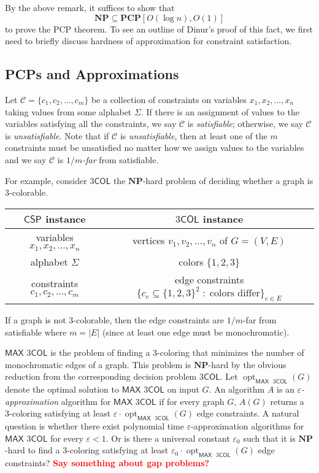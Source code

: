 \documentclass{article}
\newcommand{\fixme}[1] { \textcolor{red} {
{\fbox{ {\bf Fix:} \ensuremath{\blacktriangleright }} {\bf #1}
\fbox{\ensuremath{\blacktriangleleft} } } } }
\newcommand{\class}[1]{\mathbf{#1}}
\newcommand{\NP}{\class{NP}}
\newcommand{\PCP}{\class{PCP}}
\newcommand{\CSP}{\mathsf{CSP}}
\newcommand{\COL}{\mathsf{COL}}
\newcommand{\MAX}{\mathsf{MAX}}
\newcommand{\opt}{{\operatorname{opt}}}
\begin{document}
By the above remark, it suffices to show that
$$
\NP \subseteq \PCP[O(\log n), O(1)]
$$
to prove the PCP theorem.
To see an outline of Dinur's proof of this fact, we first need to briefly
discuss hardness of approximation for constraint satisfaction.

\subsection{PCPs and Approximations}


Let $\mathcal{C} = \{c_1, c_2, \dots, c_m\}$ be a collection of constraints on
variables $x_1, x_2, \dots, x_n$ taking values from some alphabet $\Sigma$.
If there is an assignment of values to the variables satisfying all the
constraints, we say $\mathcal{C}$ is \emph{satisfiable}; otherwise, we say
$\mathcal{C}$ is \emph{unsatisfiable}.
Note that if $\mathcal{C}$ is \emph{unsatisfiable}, then at least one of the
$m$ constraints must be unsatisfied no matter how we assign values to the
variables and we say $\mathcal{C}$ is \emph{$1/m$-far} from satisfiable. 

For example, consider $3\COL$ the $\NP$-hard problem of deciding whether a graph is 3-colorable.
\begin{center}
\begin{tabular}{c @{$\quad\longleftrightarrow\quad$} c}
$\CSP$ instance & $3\COL$ instance\\
\hline
variables $x_1, x_2, \dots, x_n$ & vertices $v_1, v_2, \dots, v_n$ of $G = (V, E)$\\
alphabet $\Sigma$ & colors $\{1, 2, 3\}$ \\
constraints $c_1, c_2, \dots, c_m$ & edge constraints $\{c_e \subseteq \{1, 2, 3\}^2 \;:\;\text{colors differ}\}_{e \in E}$\\
\end{tabular}
\end{center}
If a graph is not 3-colorable, then the edge constraints are $1/m$-far from satisfiable
where $m=|E|$ (since at least one edge must be monochromatic).

$\MAX$ $3\COL$ is the problem of finding a 3-coloring that minimizes the
number of monochromatic edges of a graph.
This problem is $\NP$-hard by the obvious reduction from the corresponding
decision problem $3\COL$.
Let $\opt_{\MAX\text{ }3\COL}(G)$ denote the optimal solution to $\MAX$ $3\COL$
on input $G$.
An algorithm $A$ is an \emph{$\varepsilon$-approximation} algorithm for
$\MAX$ $3\COL$ if for every graph $G$, $A(G)$ returns a 3-coloring
satisfying at least $\varepsilon \cdot \opt_{\MAX\text{ }3\COL}(G)$
edge constraints.
A natural question is whether there exist polynomial time $\varepsilon$-approximation
algorithms for $\MAX$ $3\COL$ for every $\varepsilon<1$.
Or is there a universal constant $\varepsilon_0$ such that it is
$\NP$-hard to find a 3-coloring satisfying at least $\varepsilon_0 \cdot \opt_{\MAX\text{ }3\COL}(G)$
edge constraints?
\fixme{Say something about gap problems?}
\end{document}
